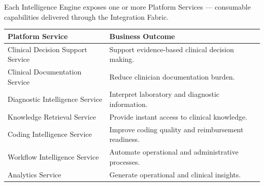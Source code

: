 Each Intelligence Engine exposes one or more Platform Services — consumable capabilities delivered through the Integration Fabric.

\vspace{4mm}

\begin{center}

\begin{tabularx}{\textwidth}{|Y|Y|}

\hline


\textbf{Platform Service} &

\textbf{Business Outcome} \\

\hline

Clinical Decision Support Service &

Support evidence-based clinical decision making. \\

\hline

Clinical Documentation Service &

Reduce clinician documentation burden. \\

\hline

Diagnostic Intelligence Service &

Interpret laboratory and diagnostic information. \\

\hline

Knowledge Retrieval Service &

Provide instant access to clinical knowledge. \\

\hline

Coding Intelligence Service &

Improve coding quality and reimbursement readiness. \\

\hline

Workflow Intelligence Service &

Automate operational and administrative processes. \\

\hline

Analytics Service &

Generate operational and clinical insights. \\

\hline

\end{tabularx}

\end{center}

